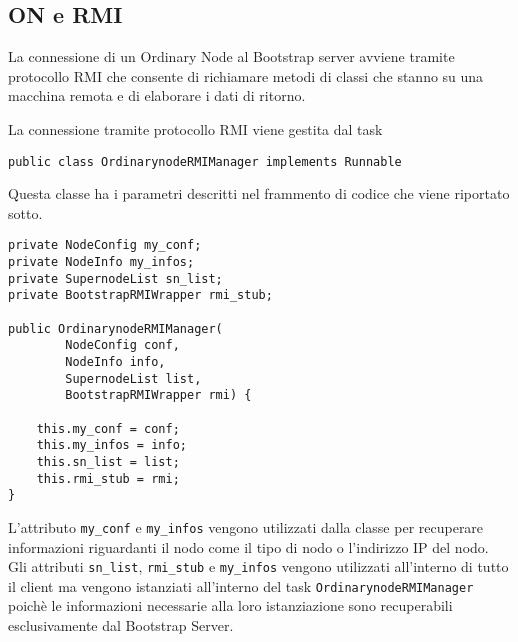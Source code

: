 \subsection{ON e RMI}
La connessione di un Ordinary Node al Bootstrap server avviene tramite protocollo RMI che consente di richiamare metodi di classi che stanno su una macchina remota e di elaborare i dati di ritorno.

La connessione tramite protocollo RMI viene gestita dal task
\begin{verbatim}
public class OrdinarynodeRMIManager implements Runnable
\end{verbatim}

Questa classe ha i parametri descritti nel frammento di codice che viene riportato sotto.
\begin{lstlisting}
private NodeConfig my_conf;
private NodeInfo my_infos;
private SupernodeList sn_list;
private BootstrapRMIWrapper rmi_stub;

public OrdinarynodeRMIManager(
		NodeConfig conf,
		NodeInfo info,
		SupernodeList list,
		BootstrapRMIWrapper rmi) {
		
	this.my_conf = conf;
	this.my_infos = info;
	this.sn_list = list;
	this.rmi_stub = rmi;
}
\end{lstlisting}
L'attributo \verb|my_conf| e \verb|my_infos| vengono utilizzati dalla classe per recuperare informazioni riguardanti il nodo come il tipo di nodo o l'indirizzo IP del nodo.
Gli attributi \verb|sn_list|, \verb|rmi_stub| e \verb|my_infos| vengono utilizzati all'interno di tutto il client ma vengono istanziati all'interno del task \verb|OrdinarynodeRMIManager| poichè le informazioni necessarie alla loro istanziazione sono recuperabili esclusivamente dal Bootstrap Server.

